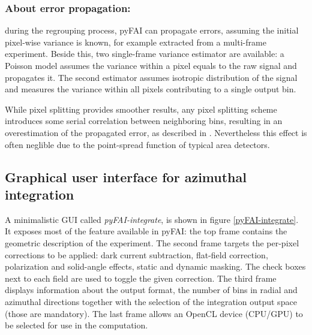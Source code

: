 \documentclass{iucr}
\begin{document}
\subsubsection{About error propagation:}
during the regrouping process, pyFAI can propagate errors, assuming the
initial pixel-wise variance is known, for example extracted from a
multi-frame experiment. Beside this, two single-frame variance estimator are
available: a Poisson model assumes the variance within a pixel equals to the
raw signal and propagates it. The second estimator assumes isotropic
distribution of the signal and measures the variance within all pixels
contributing to a single output bin. 

While pixel splitting provides smoother
results, any pixel splitting scheme introduces some serial correlation between
neighboring bins, resulting in an overestimation of the propagated error,
as described in \cite{billinge2014}. 
Nevertheless this effect is often neglible due to the point-spread function
of typical area detectors.

\subsection{Graphical user interface for azimuthal integration}

A minimalistic GUI called \textit{pyFAI-integrate}, is
shown in figure \ref{pyFAI-integrate}.
It exposes most of the feature available in pyFAI:
the top frame contains the geometric description of the experiment.
The second frame targets the per-pixel corrections to be applied: dark current
subtraction, flat-field correction, polarization and solid-angle effects, static and dynamic
masking. The check boxes next to each field are used to toggle the given correction.
The third frame displays information about the output format, the
number of bins in radial and azimuthal directions together with the
selection of the integration output space (those are mandatory).
The last frame allows an OpenCL device (CPU/GPU) to be selected for use in
the computation.
\end{document}
